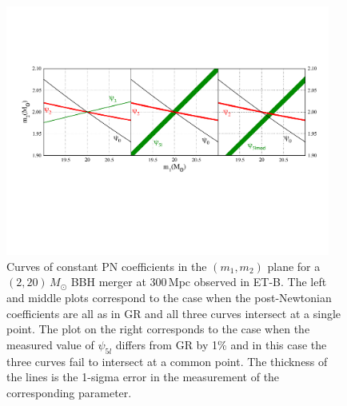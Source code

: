 \begin{figure}
\centering
\includegraphics[width=0.95\textwidth]{./Sec_ET_ScienceCase/m1m2_2e02e1_p5lvsp5lmod1p.pdf}

\caption{Curves of constant PN coefficients in the $(m_1,m_2)$ plane 
for a  $(2,20)\,M_\odot$ BBH merger at 300\,Mpc observed in ET-B.  The left 
and middle plots correspond to the case when the post-Newtonian 
coefficients are all as in GR and all three curves intersect at a 
single point. The plot on the right corresponds to the case when the 
measured value of $\psi_{5l}$ differs from GR by 1\% and in this 
case the three curves fail to intersect at a common point.  The
thickness of the lines is the 1-sigma error in the measurement
of the corresponding parameter. \label{fig:m1m2plots}}
\end{figure}

